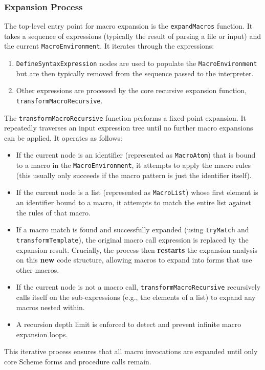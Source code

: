 \documentclass[final]{cmpreport_02}
\begin{document}
\subsubsection{Expansion Process}
The top-level entry point for macro expansion is the \texttt{expandMacros} function. It takes a sequence of expressions (typically the result of parsing a file or input) and the current \texttt{MacroEnvironment}. It iterates through the expressions:
\begin{enumerate}
    \item \texttt{DefineSyntaxExpression} nodes are used to populate the \texttt{MacroEnvironment} but are then typically removed from the sequence passed to the interpreter.
    \item Other expressions are processed by the core recursive expansion function, \texttt{transformMacroRecursive}.
\end{enumerate}
The \texttt{transformMacroRecursive} function performs a fixed-point expansion. It repeatedly traverses an input expression tree until no further macro expansions can be applied. It operates as follows:
\begin{itemize}
    \item If the current node is an identifier (represented as \texttt{MacroAtom}) that is bound to a macro in the \texttt{MacroEnvironment}, it attempts to apply the macro rules (this usually only succeeds if the macro pattern is just the identifier itself).
    \item If the current node is a list (represented as \texttt{MacroList}) whose first element is an identifier bound to a macro, it attempts to match the entire list against the rules of that macro.
    \item If a macro match is found and successfully expanded (using \texttt{tryMatch} and \texttt{transformTemplate}), the original macro call expression is replaced by the expansion result. Crucially, the process then \textbf{restarts} the expansion analysis on this \textbf{new} code structure, allowing macros to expand into forms that use other macros.
    \item If the current node is not a macro call, \texttt{transformMacroRecursive} recursively calls itself on the sub-expressions (e.g., the elements of a list) to expand any macros nested within.
    \item A recursion depth limit is enforced to detect and prevent infinite macro expansion loops.
\end{itemize}
This iterative process ensures that all macro invocations are expanded until only core Scheme forms and procedure calls remain.
\end{document}
